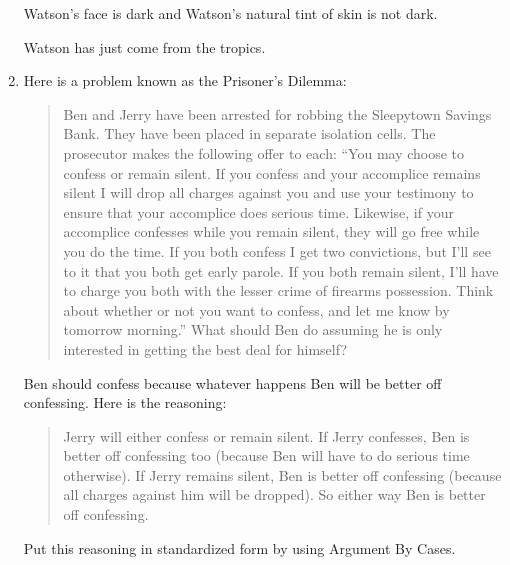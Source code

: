 \begin{enumerate}
{\begin{argument*}
 \aitem Watson's face is dark and Watson's natural tint of skin is not 
 dark.

 \aergo Watson has just come from the tropics. 


\end{argument*}

}



\item Here is a problem known as the Prisoner's Dilemma:

 \begin{quote}
Ben and Jerry have been arrested for robbing the Sleepytown Savings Bank. They 
have been placed in separate isolation cells. The prosecutor makes the following 
offer to each: ``You may choose to confess or remain silent.  If you confess and 
your accomplice remains silent I will drop all charges against you and use your 
testimony to ensure that your accomplice does serious time.  Likewise, if your 
accomplice confesses while you remain silent, they will go free while you do the 
time. If you both confess I get two convictions, but I'll see to it that you 
both get early parole. If you both remain silent, I'll have to charge you both 
with the lesser crime of firearms possession.  Think about whether or not you 
want to confess, and let me know by tomorrow morning.'' What should Ben do 
assuming he is only interested in getting the best deal for himself?
\end{quote}

Ben should confess because whatever happens Ben will be better off 
confessing.  Here is the reasoning:

\begin{quote}

Jerry will either confess or remain silent. If Jerry confesses, Ben is 
better off confessing too (because Ben  will have to do serious time  
otherwise).  If Jerry remains silent, Ben is better off confessing (because all 
charges against him will be dropped). So either way Ben is better off 
confessing.

\end{quote}


Put this reasoning in standardized form by using Argument By Cases.

\end{enumerate}
